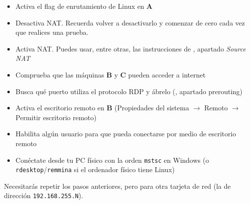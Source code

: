 \begin{homeworkProblem}
  \begin{itemize}
  \item Activa el flag de enrutamiento de Linux en \textbf{A}
  \item Desactiva NAT. Recuerda volver a desactivarlo y comenzar de cero cada vez que realices una prueba.
    \begin{comment}
      iptables -t nat –F
    \end{comment}
  \item Activa NAT. Puedes usar, entre otras, las instrucciones de , apartado \textit{Source NAT}
  \item Comprueba que las máquinas \textbf{B} y \textbf{C} pueden acceder a internet
  \end{itemize}
\end{homeworkProblem}

\begin{homeworkProblem}
  \begin{itemize}
    
  \item Busca qué puerto utiliza el protocolo RDP y ábrelo (, apartado prerouting)
  \item Activa el escritorio remoto en \textbf{B} (Propiedades del sistema $\rightarrow$ Remoto $\rightarrow$ Permitir escritorio remoto)
    
  \item Habilita algún usuario para que pueda conectarse por medio de escritorio remoto
  \item Conéctate desde tu PC físico con la orden \texttt{mstsc} en  Windows (o \texttt{rdesktop}/\texttt{remmina} si el ordenador físico tiene Linux)
  \end{itemize}

\end{homeworkProblem}


\begin{homeworkProblem}
  Necesitarás repetir los pasos anteriores, pero para otra tarjeta de red (la de dirección \texttt{192.168.255.N}).
\end{homeworkProblem}


